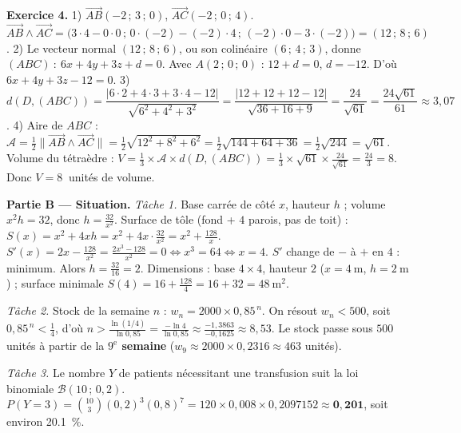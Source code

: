 \noindent\textbf{Exercice 4.}
1) $\overrightarrow{AB}(-2\,;\,3\,;\,0)$, $\overrightarrow{AC}(-2\,;\,0\,;\,4)$.
$\overrightarrow{AB}\wedge\overrightarrow{AC}=
\big(3\cdot4-0\cdot0\,;\,0\cdot(-2)-(-2)\cdot4\,;\,(-2)\cdot0-3\cdot(-2)\big)
=(12\,;\,8\,;\,6)$.
2) Le vecteur normal $(12\,;\,8\,;\,6)$, ou son colinéaire $(6\,;\,4\,;\,3)$, donne
$(ABC)\ :\ 6x+4y+3z+d=0$. Avec $A(2\,;\,0\,;\,0)$ : $12+d=0$, $d=-12$. D'où
$6x+4y+3z-12=0$.
3) $d(D,(ABC))=\dfrac{|6\cdot2+4\cdot3+3\cdot4-12|}{\sqrt{6^2+4^2+3^2}}
=\dfrac{|12+12+12-12|}{\sqrt{36+16+9}}=\dfrac{24}{\sqrt{61}}=\dfrac{24\sqrt{61}}{61}
\approx3{,}07$.
4) Aire de $ABC$ : $\mathcal{A}=\frac12\|\overrightarrow{AB}\wedge
\overrightarrow{AC}\|=\frac12\sqrt{12^2+8^2+6^2}=\frac12\sqrt{144+64+36}
=\frac12\sqrt{244}=\sqrt{61}$.
Volume du tétraèdre : $V=\frac13\times\mathcal{A}\times d(D,(ABC))
=\frac13\times\sqrt{61}\times\frac{24}{\sqrt{61}}=\frac{24}{3}=8$. Donc
$V=\SI{8}{}$ unités de volume.

\smallskip
\noindent\textbf{Partie B — Situation.}
\emph{Tâche 1.} Base carrée de côté $x$, hauteur $h$ ; volume $x^2h=32$, donc
$h=\frac{32}{x^2}$. Surface de tôle (fond + $4$ parois, pas de toit) :
$S(x)=x^2+4xh=x^2+4x\cdot\frac{32}{x^2}=x^2+\frac{128}{x}$.
$S'(x)=2x-\frac{128}{x^2}=\frac{2x^3-128}{x^2}=0\Leftrightarrow x^3=64
\Leftrightarrow x=4$. $S'$ change de $-$ à $+$ en $4$ : minimum. Alors
$h=\frac{32}{16}=2$. Dimensions : base $4\times4$, hauteur $2$ ($x=\SI{4}{\metre}$,
$h=\SI{2}{\metre}$) ; surface minimale $S(4)=16+\frac{128}{4}=16+32
=\SI{48}{\metre\squared}$.

\emph{Tâche 2.} Stock de la semaine $n$ : $w_n=2000\times0{,}85^{\,n}$. On résout
$w_n<500$, soit $0{,}85^{\,n}<\frac14$, d'où $n>\frac{\ln(1/4)}{\ln0{,}85}
=\frac{-\ln4}{\ln0{,}85}\approx\frac{-1{,}3863}{-0{,}1625}\approx8{,}53$. Le stock
passe sous $500$ unités à partir de la \textbf{$9^{\text{e}}$ semaine}
($w_9\approx2000\times0{,}2316\approx463$ unités).

\emph{Tâche 3.} Le nombre $Y$ de patients nécessitant une transfusion suit la loi
binomiale $\mathcal{B}(10\,;\,0{,}2)$. $P(Y=3)=\binom{10}{3}(0{,}2)^3(0{,}8)^7
=120\times0{,}008\times0{,}2097152\approx\mathbf{0{,}201}$, soit environ
\SI{20,1}{\percent}.

